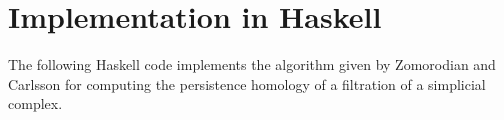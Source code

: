 \section{Implementation in Haskell}
\label{code-appendix}

The following Haskell code implements the algorithm given by Zomorodian and Carlsson \cite{zomorodian2005computing} for computing the persistence homology of a filtration of a simplicial complex.

\lstset{ %
  basicstyle=\footnotesize,        %
  breakatwhitespace=true,         %
  breaklines=true,                 %
}









